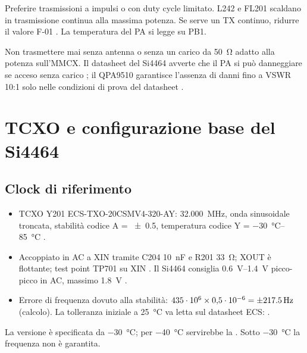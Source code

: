 \begin{regola}
Preferire trasmissioni a impulsi o con duty cycle limitato. L242 e FL201 scaldano in trasmissione continua alla massima potenza. Se serve un TX continuo, ridurre il valore F-01 . La temperatura del PA si legge su PB1.
\end{regola}

\begin{attenzione}
Non trasmettere mai senza antenna o senza un carico da \SI{50}{\ohm} adatto alla potenza sull'MMCX. Il datasheet del Si4464 avverte che il PA si può danneggiare se acceso senza carico ; il QPA9510 garantisce l'assenza di danni fino a VSWR 10:1 solo nelle condizioni di prova del datasheet .
\end{attenzione}

\section{TCXO e configurazione base del Si4464}
\label{sec:si-config}

\subsection{Clock di riferimento}
\begin{itemize}
\item TCXO Y201 ECS-TXO-20CSMV4-320-AY: \SI{32.000}{\mega\hertz}, onda sinusoidale troncata, stabilità codice A = \SI{\pm0.5}{\ppm}, temperatura codice Y = \SIrange{-30}{85}{\celsius} .
\item Accoppiato in AC a XIN tramite C204 \SI{10}{\nano\farad} e R201 \SI{33}{\ohm}; XOUT è flottante; test point TP701 su XIN . Il Si4464 consiglia \SIrange{0.6}{1.4}{\volt} picco-picco in AC, massimo \SI{1.8}{\volt} .
\item Errore di frequenza dovuto alla stabilità: $435\cdot10^6\times0{,}5\cdot10^{-6} = \SI{\pm217.5}{\hertz}$ (calcolo). La tolleranza iniziale a \SI{25}{\celsius} va letta sul datasheet ECS: \DV.
\end{itemize}

\begin{verifica}
La versione  è specificata da \SI{-30}{\celsius}; per \SI{-40}{\celsius} servirebbe la  . Sotto \SI{-30}{\celsius} la frequenza non è garantita.
\end{verifica}

